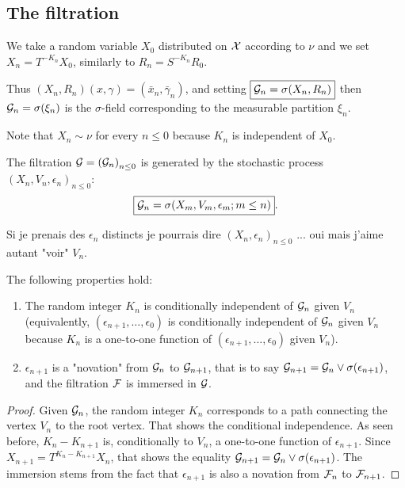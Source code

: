 \documentclass[12pt,a4paper]{article}
\begin{document}
\subsection{The filtration} 



We take a random variable $X_0$ distributed on $\mathcal{X}$ according to $\nu$ 
and we set $\boxed{X_n = T^{-K_n} X_0}$, similarly to $R_n = S^{-K_n} R_0$. 

Thus $(X_n,R_n)(x,\gamma) = (\bar x_n, \bar\gamma_n)$, 
and setting $\boxed{\mathcal{G}_n = \sigma(X_n, R_n)}$ then 
$\mathcal{G}_n = \sigma(\xi_n)$ is the $\sigma$-field corresponding to 
the measurable partition $\xi_n$. 

Note that $X_n \sim \nu$ for every $n \leq 0$ because $K_n$ is independent of $X_0$.

The filtration $\mathcal{G}={(\mathcal{G}_n)}_{n \leq 0}$ is  generated by the stochastic process 
${(X_n, V_n, \epsilon_n)}_{n \leq 0}$:
$$
\boxed{\mathcal{G}_n = \sigma(X_m, V_m, \epsilon_m; m \leq n)}. 
$$


\begin{remark}
Si je prenais des $\epsilon_n$ distincts je pourrais dire 
${(X_n, \epsilon_n)}_{n \leq 0}$ ... oui mais j'aime autant "voir" $V_n$.
\end{remark}

\begin{lemma}\label{lemma:novation}
The following properties hold:
\begin{enumerate}
\item The random integer $K_n$ is conditionally independent of $\mathcal{G}_n$ 
given $V_n$ (equivalently, $(\epsilon_{n+1}, \ldots, \epsilon_0)$ 
is conditionally independent of $\mathcal{G}_n$ 
given $V_n$ because $K_n$ is a one-to-one function of 
$(\epsilon_{n+1}, \ldots, \epsilon_0)$ given $V_n$).

\item $\epsilon_{n+1}$ is 
a "novation" from $\mathcal{G}_n$ to $\mathcal{G}_{n+1}$, that is 
to say $\mathcal{G}_{n+1} = \mathcal{G}_n \vee \sigma(\epsilon_{n+1})$, and  
the filtration $\mathcal{F}$ is immersed in $\mathcal{G}$.
\end{enumerate}
\end{lemma}

\begin{proof}
Given $\mathcal{G}_n$, the random integer $K_n$ corresponds to a path  
connecting the vertex $V_n$ to the root vertex. 
That shows the conditional independence. 
As seen before, $K_{n}-K_{n+1}$ is, conditionally to $V_n$, 
a one-to-one function of $\epsilon_{n+1}$. Since 
$X_{n+1} = T^{K_{n}-K_{n+1}}X_n$, that shows the equality 
$\mathcal{G}_{n+1} = \mathcal{G}_n \vee \sigma(\epsilon_{n+1})$. 
The immersion stems from the fact that 
 $\epsilon_{n+1}$ is also a novation from $\mathcal{F}_n$ to $\mathcal{F}_{n+1}$.  
\end{proof}
\end{document}
